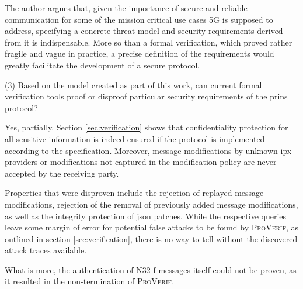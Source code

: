The author argues that, given the importance of secure and reliable communication for some of the mission critical use cases 5G is supposed to address, specifying a concrete threat model and security requirements derived from it is indispensable.
More so than a formal verification, which proved rather fragile and vague in practice, a precise definition of the requirements would greatly facilitate the development of a secure protocol.\bigskip

\noindent
(3) Based on the model created as part of this work, can current formal verification tools proof or disproof particular security requirements of the \gls{prins} protocol?

Yes, partially.
Section \ref{sec:verification} shows that confidentiality protection for all sensitive information is indeed ensured if the protocol is implemented according to the specification.
Moreover, message modifications by unknown \gls{ipx} providers or modifications not captured in the modification policy are never accepted by the receiving party.

Properties that were disproven include the rejection of replayed message modifications, rejection of the removal of previously added message modifications, as well as the integrity protection of \gls{json} patches.
While the respective queries leave some margin of error for potential false attacks to be found by \textsc{ProVerif}, as outlined in section \ref{sec:verification}, there is no way to tell without the discovered attack traces available.

What is more, the authentication of N32-f messages itself could not be proven, as it resulted in the non-termination of \textsc{ProVerif}.